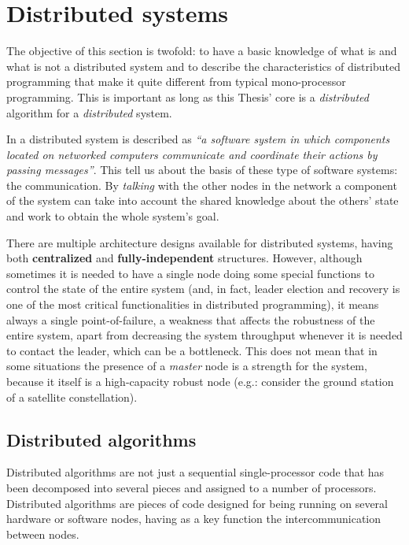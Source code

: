 
\section{Distributed systems}

The objective of this section is twofold: to have a basic knowledge of what is and what is not a distributed system and to describe the characteristics of distributed programming that make it quite different from typical mono-processor programming. This is important as long as this Thesis' core is a \emph{distributed} algorithm for a \emph{distributed} system.

In \citep{Coulouris:2011:DSC:2029110} a distributed system is described as \textit{``a software system in which components located on networked computers communicate and coordinate their actions by passing messages''}. This tell us about the basis of these type of software systems: the communication. By \emph{talking} with the other nodes in the network a component of the system can take into account the shared knowledge about the others' state and work to obtain the whole system's goal.

There are multiple architecture designs available for distributed systems, having both \textbf{centralized} and \textbf{fully-independent} structures. However, although sometimes it is needed to have a single node doing some special functions to control the state of the entire system (and, in fact, leader election and recovery is one of the most critical functionalities in distributed programming), it means always a single point-of-failure, a weakness that affects the robustness of the entire system, apart from decreasing the system throughput whenever it is needed to contact the leader, which can be a bottleneck. This does not mean that in some situations the presence of a \emph{master} node is a strength for the system, because it itself is a high-capacity robust node (e.g.: consider the ground station of a satellite constellation).

\subsection{Distributed algorithms}
 
Distributed algorithms are not just a sequential single-processor code that has been decomposed into several pieces and assigned to a number of processors. Distributed algorithms are pieces of code designed for being running on several hardware or software nodes, having as a key function the intercommunication between nodes.

